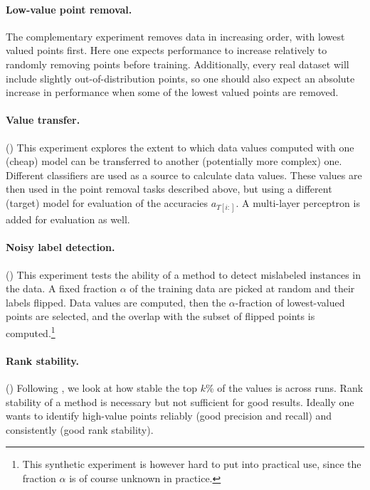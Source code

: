 \documentclass[10pt]{article}
\begin{document}
\paragraph{Low-value point removal.} The complementary experiment removes data
in increasing order, with lowest valued points first. Here one expects
performance to increase relatively to randomly removing points before
training. Additionally, every real dataset will include slightly
out-of-distribution points, so one should also expect an absolute increase in
performance when some of the lowest valued points are removed.

\paragraph{Value transfer.}() This experiment
explores the extent to which data values computed with one (cheap) model can
be transferred to another (potentially more complex) one. Different
classifiers are used as a source to calculate data values. These values are
then used in the point removal tasks described above, but using a different
(target) model for evaluation of the accuracies $a_{T [i :]}$. A multi-layer
perceptron is added for evaluation as well.

\paragraph{Noisy label detection.}() This experiment
tests the ability of a method to detect mislabeled instances in the data. A
fixed fraction $\alpha$ of the training data are picked at random and their
labels flipped. Data values are computed, then the $\alpha$-fraction of
lowest-valued points are selected, and the overlap with the subset of flipped
points is computed.\footnote{This synthetic experiment is however hard to put
into practical use, since the fraction $\alpha$ is of course unknown in
practice.}

\paragraph{Rank stability.}() Following
{\cite{wang_data_2022}}, we look at how stable the top $k$\% of the values is
across runs. Rank stability of a method is necessary but not sufficient for
good results. Ideally one wants to identify high-value points reliably (good
precision and recall) and consistently (good rank stability).
\end{document}
